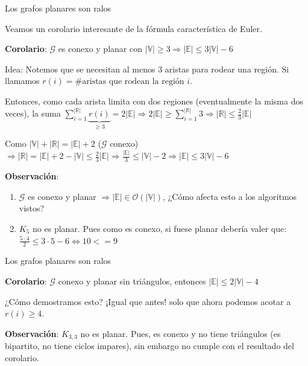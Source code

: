 \documentclass[8pt]{beamer}
\newcommand \anchoPagina{1.0} %
\begin{document}
\begin{frame}{Los grafos planares son ralos}
	\begin{minipage}{\anchoPagina \textwidth}
		Veamos un corolario interesante de la f\'ormula caracter\'istica de Euler.
		
		\textbf{Corolario}: $\mathcal{G}$ es conexo y planar con $|\mathbb{V}| \geq 3 \Rightarrow |\mathbb{E}| \leq 3|\mathbb{V}| - 6$
		
		\pause
		Idea: Notemos que se necesitan al menos 3 aristas para rodear una regi\'on. Si llamamos $r(i) = \# \text{aristas que rodean la regi\'on } i $.
		
		\pause
		Entonces, como cada arista limita con dos regiones (eventualmente la misma dos veces), la suma $\sum\limits_{i = 1}^{|\mathbb{R}|} \underbrace{r(i)}_{\geq 3} = 2|\mathbb{E}| \Rightarrow 2|\mathbb{E}| \geq \sum\limits_{i = 1}^{|\mathbb{R}|} 3 \Rightarrow |\mathbb{R}| \leq \frac{2}{3} |\mathbb{E}| $
		
		\pause 
		
		Como $|\mathbb{V}| + |\mathbb{R}| = |\mathbb{E}| + 2$ ($\mathcal{G}$ conexo) $\Rightarrow |\mathbb{R}| = |\mathbb{E}| + 2 - |\mathbb{V}| \leq \frac{2}{3} |\mathbb{E}| \Rightarrow \frac{|\mathbb{E}|}{3} \leq |\mathbb{V}| - 2 \Rightarrow \boxed{|\mathbb{E}| \leq 3|\mathbb{V}|-6} $
		
		\pause
		
		\textbf{Observaci\'on}:
		\begin{enumerate}
			\item $\mathcal{G}$ es conexo y planar $ \Rightarrow |\mathbb{E}| \in \mathcal{O}(|\mathbb{V}|) $, ¿C\'omo afecta esto a los algoritmos vistos?
			\item $K_5$ no es planar. Pues como es conexo, si fuese planar deber\'ia valer que: $\frac{5 \cdot 4}{2} \leq 3\cdot 5-6 \iff 10 <= 9$
		\end{enumerate}
	\end{minipage}
\end{frame}

\begin{frame}{Los grafos planares son ralos}
	\begin{minipage}{\anchoPagina \textwidth}
		\textbf{Corolario}: $\mathcal{G}$ conexo y planar sin tri\'angulos, entonces $|\mathbb{E}| \leq 2|\mathbb{V}| - 4$
		
		\pause ¿C\'omo demostramos esto? \pause ¡Igual que antes! solo que ahora podemos acotar a $r(i) \geq 4$.
		
		\textbf{Observaci\'on}: $K_{3,3}$ no es planar. Pues, es conexo y no tiene tri\'angulos (es bipartito, no tiene ciclos impares), sin embargo no cumple con el resultado del corolario.
		
	\end{minipage}
	
	 
	
\end{frame}
\end{document}
